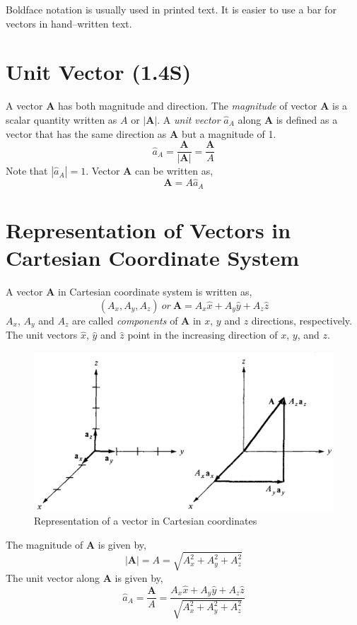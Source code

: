 \documentclass[12pt,a4paper]{article}
\begin{document}
Boldface notation is usually used in printed text. It is easier to use a bar for vectors in hand--written text.
\section{Unit Vector (1.4S)}
A vector \textbf{A} has both magnitude and direction. The \textit{magnitude} of vector \textbf{A} is a scalar quantity written as $A$ or $|\textbf{A}|$. A \textit{unit vector} $\hat{a}_A$ along \textbf{A} is defined as a vector that has the same direction as \textbf{A} but a magnitude of 1.
\begin{equation}
\hat{a}_A=\dfrac{\textbf{A}}{|\textbf{A}|}=\dfrac{\textbf{A}}{A}
\end{equation}
Note that $|\hat{a}_A|=1$. Vector \textbf{A} can be written as,
\begin{equation}
\textbf{A}=A\hat{a}_A
\end{equation}
\section{Representation of Vectors in Cartesian Coordinate System}
A vector \textbf{A} in Cartesian coordinate system is written as,
\begin{equation}
(A_x,A_y,A_z)~or~\textbf{A}=A_x\hat{x}+A_y\hat{y}+A_z\hat{z}
\end{equation}
$A_x$, $A_y$ and $A_z$ are called \textit{components} of \textbf{A} in $x$, $y$ and $z$ directions, respectively. The unit vectors $\hat x$, $\hat y$ and $\hat z$ point in the increasing direction of $x$, $y$, and $z$.
\begin{figure}[H]
\includegraphics[scale=0.5]{Figure1-1S.png}
\caption{Representation of a vector in Cartesian coordinates \cite[fig. 1.1]{Sadiku}}
\label{components-of-A}
\end{figure}
The magnitude of \textbf{A} is given by,
\begin{equation}
|\textbf{A}|=A=\sqrt{A_x^2+A_y^2+A_z^2}
\end{equation}
The unit vector along \textbf{A} is given by,
\begin{equation}
\hat{a}_A=\dfrac{\textbf{A}}{A}=\dfrac{A_x\hat{x}+A_y\hat{y}+A_z\hat{z}}{\sqrt{A_x^2+A_y^2+A_z^2}}
\end{equation}
\end{document}
